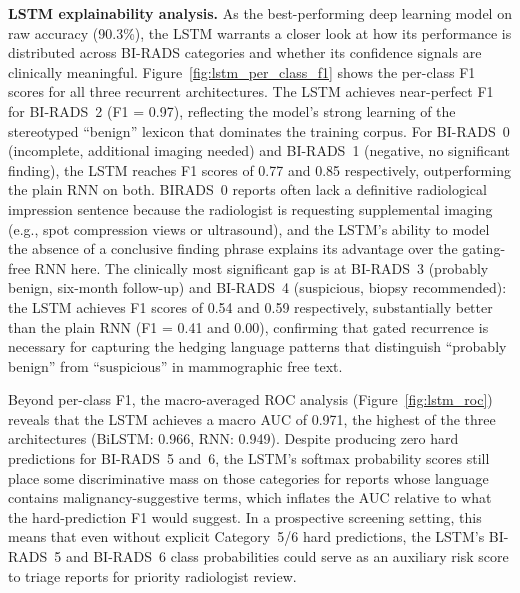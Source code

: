 \documentclass[11pt,a4paper]{article}
\begin{document}
\textbf{LSTM explainability analysis.}
As the best-performing deep learning model on raw accuracy (90.3\%), the LSTM
warrants a closer look at how its performance is distributed across BI-RADS
categories and whether its confidence signals are clinically meaningful.
Figure~\ref{fig:lstm_per_class_f1} shows the per-class F1 scores for all
three recurrent architectures.
The LSTM achieves near-perfect F1 for BI-RADS~2 (F1 = 0.97), reflecting the
model's strong learning of the stereotyped ``benign'' lexicon that dominates
the training corpus.
For BI-RADS~0 (incomplete, additional imaging needed) and BI-RADS~1 (negative,
no significant finding), the LSTM reaches F1 scores of 0.77 and 0.85
respectively, outperforming the plain RNN on both.
BIRADS~0 reports often lack a definitive radiological impression sentence
because the radiologist is requesting supplemental imaging (e.g., spot
compression views or ultrasound), and the LSTM's ability to model the
absence of a conclusive finding phrase explains its advantage over the
gating-free RNN here.
The clinically most significant gap is at BI-RADS~3 (probably benign,
six-month follow-up) and BI-RADS~4 (suspicious, biopsy recommended): the LSTM
achieves F1 scores of 0.54 and 0.59 respectively, substantially better than
the plain RNN (F1 = 0.41 and 0.00), confirming that gated recurrence is
necessary for capturing the hedging language patterns that distinguish
``probably benign'' from ``suspicious'' in mammographic free text.

Beyond per-class F1, the macro-averaged ROC analysis
(Figure~\ref{fig:lstm_roc}) reveals that the LSTM achieves a macro AUC of
0.971, the highest of the three architectures (BiLSTM: 0.966, RNN: 0.949).
Despite producing zero hard predictions for BI-RADS~5 and~6, the LSTM's
softmax probability scores still place some discriminative mass on those
categories for reports whose language contains malignancy-suggestive terms,
which inflates the AUC relative to what the hard-prediction F1 would suggest.
In a prospective screening setting, this means that even without explicit
Category~5/6 hard predictions, the LSTM's BI-RADS~5 and BI-RADS~6 class
probabilities could serve as an auxiliary risk score to triage reports for
priority radiologist review.
\end{document}

